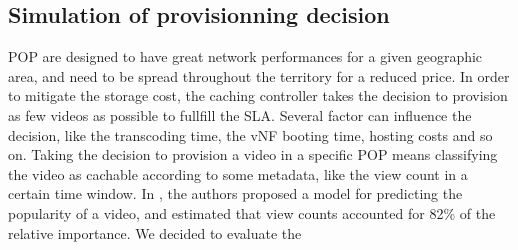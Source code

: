 \subsection{Simulation of provisionning decision} \label{provisionningdecisions}

POP are designed to have great network performances for a given geographic area, and need to be spread throughout the territory for a reduced price.
In order to mitigate the storage cost, the caching controller takes the decision to provision as few videos as possible to fullfill the SLA. Several factor can influence the decision, like the transcoding time, the vNF booting time, hosting costs and so on.
Taking the decision to provision a video in a specific POP means classifying the video as cachable according to some metadata, like the view count in a certain time window.
In \cite{silvestre_boosting_2015}, the authors proposed a model for predicting the popularity of a video, and estimated that view counts accounted for 82\% of the relative importance. 
We decided to evaluate the 




